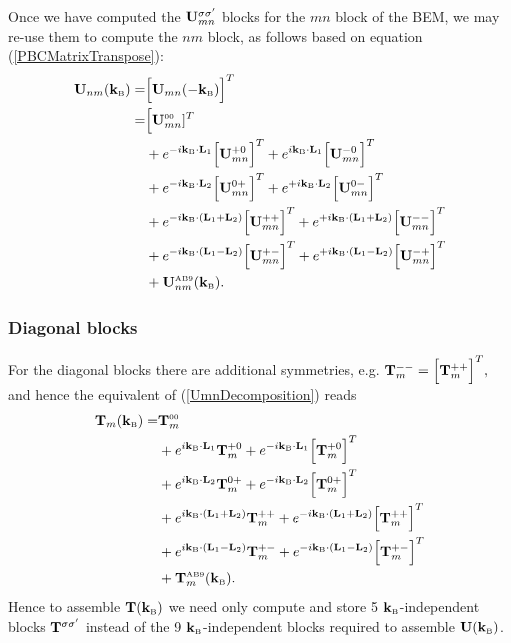 Once we have computed the 
$\vb U_{mn}^{\sigma\sigma^\prime}$ blocks for the $mn$ block of 
the BEM, we may re-use them to compute the $nm$ block, as follows 
based on equation (\ref{PBCMatrixTranspose}):
\begin{align}
\vb U_{nm}(\KB) 
=  &\Big[\vb U_{mn}(-\KB)\Big]^T 
\\
=  &\Big[\vb U_{mn}\supt{00}]^T
\\
   & + e^{ -i \KB \cdot \vb L_1} \Big[\vb U_{mn}^{+0}\Big]^T
     + e^{  i \KB \cdot \vb L_1} \Big[\vb U_{mn}^{-0}\Big]^T
\nn
   & + e^{ -i \KB \cdot \vb L_2} \Big[\vb U_{mn}^{0+}\Big]^T
     + e^{ +i \KB \cdot \vb L_2} \Big[\vb U_{mn}^{0-}\Big]^T
\nn
   & + e^{ -i \KB \cdot (\vb L_1+\vb L_2)} \Big[\vb U_{mn}^{++}\Big]^T
     + e^{ +i \KB \cdot (\vb L_1+\vb L_2)} \Big[\vb U_{mn}^{--}\Big]^T
\nn
   & + e^{ -i \KB \cdot (\vb L_1-\vb L_2)} \Big[\vb U_{mn}^{+-}\Big]^T
     + e^{ +i \KB \cdot (\vb L_1-\vb L_2)} \Big[\vb U_{mn}^{-+}\Big]^T
\nn
   & + \vb U_{nm}\supt{AB9}(\KB).
\nonumber
\end{align}

\subsubsection*{Diagonal blocks}

For the diagonal blocks there are additional symmetries, e.g.
$ \vb T_{m}^{--} = \Big[\vb T_{m}^{++}\Big]^T, $
and hence the equivalent of (\ref{UmnDecomposition}) reads 
\begin{align}
\vb T_{m}(\KB)
 =   &\vb T_{m}\supt{00}
\label{TmDecomposition}\\
   & + e^{ i \KB \cdot \vb L_1} \vb T_{m}^{+0}
     + e^{-i \KB \cdot \vb L_1} \Big[\vb T_{m}^{+0}\Big]^T
\nn
   & + e^{ i \KB \cdot \vb L_2} \vb T_{m}^{0+}
     + e^{-i \KB \cdot \vb L_2} \Big[\vb T_{m}^{0+}\Big]^T
\nn
   & + e^{ i \KB \cdot (\vb L_1+\vb L_2)} \vb T_{m}^{++}
     + e^{-i \KB \cdot (\vb L_1+\vb L_2)} \Big[ \vb T_{m}^{++}\Big]^T
\nn
   & + e^{ i \KB \cdot (\vb L_1-\vb L_2)} \vb T_{m}^{+-}
     + e^{-i \KB \cdot (\vb L_1-\vb L_2)} \Big[ \vb T_{m}^{+-}\Big]^T
\nn
   & + \vb T_{m}\supt{AB9}(\KB).
\nonumber
\end{align}
Hence to assemble $\vb T(\KB)$ we need only compute and
store 5 $\KB$-independent blocks $\vb T^{\sigma \sigma^\prime}$
instead of the 9 $\KB$-independent blocks required to assemble
$\vb U(\KB)$.
